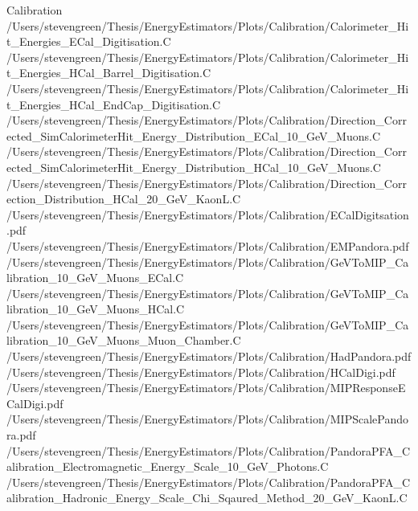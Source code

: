 Calibration
/Users/stevengreen/Thesis/EnergyEstimators/Plots/Calibration/Calorimeter_Hit_Energies_ECal_Digitisation.C /Users/stevengreen/Thesis/EnergyEstimators/Plots/Calibration/Calorimeter_Hit_Energies_HCal_Barrel_Digitisation.C /Users/stevengreen/Thesis/EnergyEstimators/Plots/Calibration/Calorimeter_Hit_Energies_HCal_EndCap_Digitisation.C /Users/stevengreen/Thesis/EnergyEstimators/Plots/Calibration/Direction_Corrected_SimCalorimeterHit_Energy_Distribution_ECal_10_GeV_Muons.C /Users/stevengreen/Thesis/EnergyEstimators/Plots/Calibration/Direction_Corrected_SimCalorimeterHit_Energy_Distribution_HCal_10_GeV_Muons.C /Users/stevengreen/Thesis/EnergyEstimators/Plots/Calibration/Direction_Correction_Distribution_HCal_20_GeV_KaonL.C /Users/stevengreen/Thesis/EnergyEstimators/Plots/Calibration/ECalDigitsation.pdf /Users/stevengreen/Thesis/EnergyEstimators/Plots/Calibration/EMPandora.pdf /Users/stevengreen/Thesis/EnergyEstimators/Plots/Calibration/GeVToMIP_Calibration_10_GeV_Muons_ECal.C /Users/stevengreen/Thesis/EnergyEstimators/Plots/Calibration/GeVToMIP_Calibration_10_GeV_Muons_HCal.C /Users/stevengreen/Thesis/EnergyEstimators/Plots/Calibration/GeVToMIP_Calibration_10_GeV_Muons_Muon_Chamber.C /Users/stevengreen/Thesis/EnergyEstimators/Plots/Calibration/HadPandora.pdf /Users/stevengreen/Thesis/EnergyEstimators/Plots/Calibration/HCalDigi.pdf /Users/stevengreen/Thesis/EnergyEstimators/Plots/Calibration/MIPResponseECalDigi.pdf /Users/stevengreen/Thesis/EnergyEstimators/Plots/Calibration/MIPScalePandora.pdf /Users/stevengreen/Thesis/EnergyEstimators/Plots/Calibration/PandoraPFA_Calibration_Electromagnetic_Energy_Scale_10_GeV_Photons.C /Users/stevengreen/Thesis/EnergyEstimators/Plots/Calibration/PandoraPFA_Calibration_Hadronic_Energy_Scale_Chi_Sqaured_Method_20_GeV_KaonL.C 
\fi


